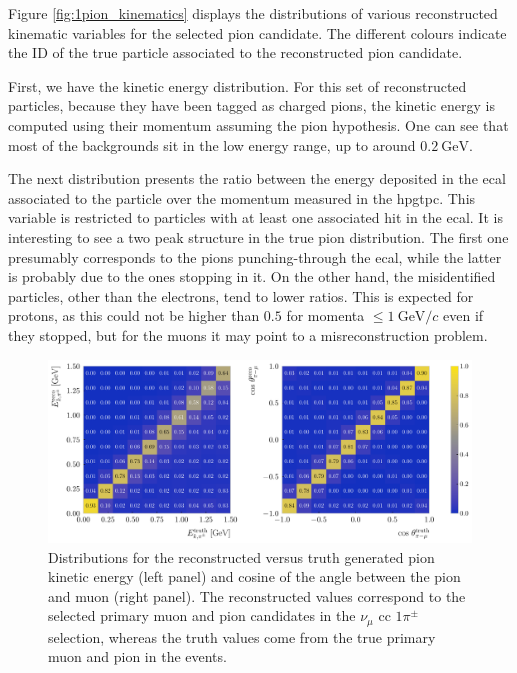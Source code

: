 Figure \ref{fig:1pion_kinematics} displays the distributions of various reconstructed kinematic variables for the selected pion candidate. The different colours indicate the ID of the true particle associated to the reconstructed pion candidate.

First, we have the kinetic energy distribution. For this set of reconstructed particles, because they have been tagged as charged pions, the kinetic energy is computed using their momentum assuming the pion hypothesis. One can see that most of the backgrounds sit in the low energy range, up to around $0.2~\mathrm{GeV}$.

The next distribution presents the ratio between the energy deposited in the \gls{ecal} associated to the particle over the momentum measured in the \gls{hpgtpc}. This variable is restricted to particles with at least one associated hit in the \gls{ecal}. It is interesting to see a two peak structure in the true pion distribution. The first one presumably corresponds to the pions punching-through the \gls{ecal}, while the latter is probably due to the ones stopping in it. On the other hand, the misidentified particles, other than the electrons, tend to lower ratios. This is expected for protons, as this could not be higher than $0.5$ for momenta $\leq 1~\mathrm{GeV}/c$ even if they stopped, but for the muons it may point to a misreconstruction problem.

\begin{figure}[t]
    \centering
    \includegraphics[width=.99\linewidth]{Images/GAr_selection/pion_selection_1pion_kinematic_comp.pdf}
    \caption[Distributions for the reconstructed versus truth pion kinetic energy and angle between the pion and muon in the $\nu_{\mu}$ \gls{cc} $1\pi^{\pm}$ selection.]{Distributions for the reconstructed versus truth generated pion kinetic energy (left panel) and cosine of the angle between the pion and muon (right panel). The reconstructed values correspond to the selected primary muon and pion candidates in the $\nu_{\mu}$ \gls{cc} $1\pi^{\pm}$ selection, whereas the truth values come from the true primary muon and pion in the events.}
    \label{fig:1pion_kinematic_comp}
\end{figure}

